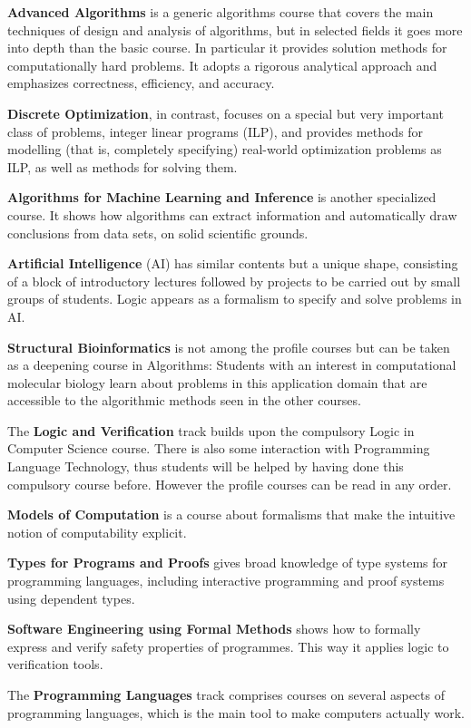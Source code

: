 \documentclass[11pt]{article}
\begin{document}
{\bf Advanced Algorithms} is a generic algorithms course that covers the main
techniques of design and analysis of algorithms, but in selected fields it 
goes more into depth than the basic course. In particular it provides 
solution methods for computationally hard problems. It adopts a rigorous 
analytical approach and emphasizes correctness, efficiency, and accuracy.

{\bf Discrete Optimization}, in contrast, focuses on a special but very 
important class of problems, integer linear programs (ILP), and provides 
methods for modelling (that is, completely specifying) real-world optimization 
problems as ILP, as well as methods for solving them.

{\bf Algorithms for Machine Learning and Inference} is another specialized course. It shows how algorithms can extract information and automatically draw 
conclusions from data sets, on solid scientific grounds. 

{\bf Artificial Intelligence} (AI) has similar contents but a unique shape, 
consisting of a block of introductory lectures followed by projects to be 
carried out by small groups of students. Logic appears as a formalism to 
specify and solve problems in AI.

{\bf Structural Bioinformatics} is not among the profile courses but can be taken as a deepening course in Algorithms: Students with an interest in 
computational molecular biology learn about problems in this application 
domain that are accessible to the algorithmic methods seen in the other courses.

\bigskip
The {\bf Logic and Verification} track builds upon the compulsory Logic in 
Computer Science course. There is also some interaction with Programming 
Language Technology, thus students will be helped by having done this 
compulsory course before. However the profile courses can be read in any order. 

{\bf Models of Computation} is a course about formalisms that make the 
intuitive notion of computability explicit. 

{\bf Types for Programs and Proofs} gives broad knowledge of type systems for 
programming languages, including interactive programming and proof systems 
using dependent types. 

{\bf Software Engineering using Formal Methods} shows how to formally express 
and verify safety properties of programmes. This way it applies logic to
verification tools.

\bigskip
The {\bf Programming Languages} track comprises courses on several aspects of
programming languages, which is the main tool to make computers actually work. 
\end{document}
